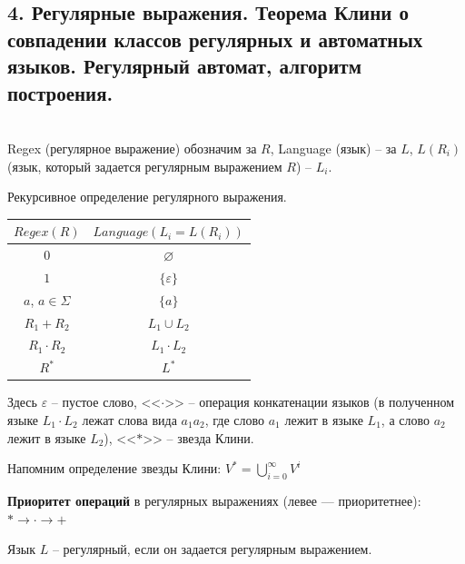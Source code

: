 \subsection{4. Регулярные выражения. Теорема Клини о совпадении классов регулярных и автоматных языков. Регулярный автомат, алгоритм построения.}

\Vars \\
Regex (регулярное выражение) обозначим за $R$, \newline Language (язык) -- за $L$, \newline $L(R_i)$ (язык, который задается регулярным выражением $R$) -- $L_i$.

\Def Рекурсивное определение регулярного выражения.

\begin{center}
    \begin{tabular}{|c|c|}
        \hline
        $Regex (R)$ & $Language (L_i = L(R_i))$ \\
        \hline
        $0$ & $\varnothing$ \\
        $1$ & $\{ \varepsilon \}$ \\
        $a$, $a \in \Sigma$ & $\{ a \}$ \\
        $R_1 + R_2$ & $L_1 \cup L_2$ \\
        $R_1 \cdot R_2$ & $L_1 \cdot L_2$ \\
        $R^*$ & $L^*$ \\
        \hline
    \end{tabular}
\end{center}

Здесь $\varepsilon$ -- пустое слово, <<$\cdot$>> -- операция конкатенации языков (в полученном языке $L_1 \cdot L_2$ лежат слова вида $a_1a_2$, где слово $a_1$ лежит в языке $L_1$, а слово $a_2$ лежит в языке $L_2$), <<$*$>> -- звезда Клини.

Напомним определение звезды Клини: $V^* = \bigcup_{i=0}^{\infty} V^i$ 

\textbf{Приоритет операций} в регулярных выражениях (левее — приоритетнее): $* \rightarrow \cdot \rightarrow +$

\Def Язык $L$ -- регулярный, если он задается регулярным выражением.

